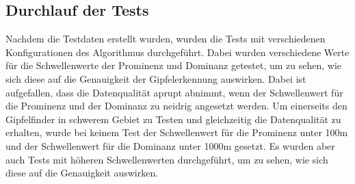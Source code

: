\subsection{Durchlauf der Tests}\label{subsec:durchlauf_der_tests}
Nachdem die Testdaten erstellt wurden, wurden die Tests mit verschiedenen Konfigurationen des Algorithmus durchgeführt. Dabei wurden verschiedene Werte für die Schwellenwerte der Prominenz und Dominanz getestet, um zu sehen, wie sich diese auf die Genauigkeit der Gipfelerkennung auswirken. Dabei ist aufgefallen, dass die Datenqualität aprupt abnimmt, wenn der Schwellenwert für die Prominenz und der Dominanz zu neidrig angesetzt werden. Um einerseits den Gipfelfinder in schwerem Gebiet zu Testen und gleichzeitig die Datenqualität zu erhalten, wurde bei keinem Test der Schwellenwert für die Prominenz unter 100m und der Schwellenwert für die Dominanz unter 1000m gesetzt. Es wurden aber auch Tests mit höheren Schwellenwerten durchgeführt, um zu sehen, wie sich diese auf die Genauigkeit auswirken.
